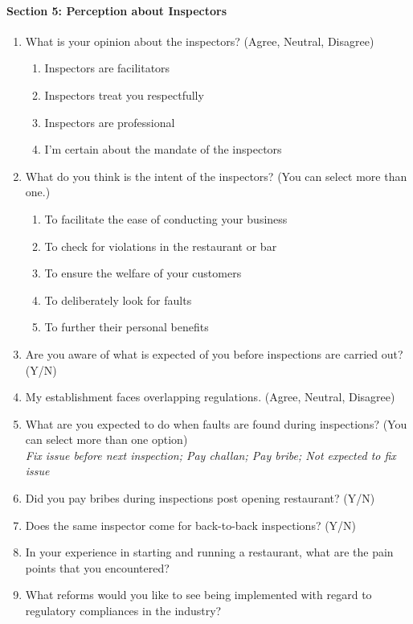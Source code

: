 \documentclass[a4paper, 12pt]{article}
\begin{document}
	\paragraph {Section 5: Perception about Inspectors}
		\begin {enumerate}[topsep=0pt, nosep]
		\item What is your opinion about the inspectors? (Agree, Neutral, Disagree)
			\begin {enumerate}[nosep]
			\item Inspectors are facilitators
			\item Inspectors treat you respectfully
			\item Inspectors are professional
			\item I’m certain about the mandate of the inspectors
			\end {enumerate}
		\item What do you think is the intent of the inspectors? (You can select more than one.)
			\begin {enumerate}[nosep]
			\item To facilitate the ease of conducting your business
			\item To check for violations in the restaurant or bar
			\item To ensure the welfare of your customers
			\item To deliberately look for faults
			\item To further their personal benefits
			\end {enumerate}
		\item Are you aware of what is expected of you before inspections are carried out?(Y/N)
		\item My establishment faces overlapping regulations. (Agree, Neutral, Disagree)
		\item What are you expected to do when faults are found during inspections? (You can select more than one option)\\
		\textit{Fix issue before next inspection; Pay challan; Pay bribe; Not expected to fix issue}
		\item Did you pay bribes during inspections post opening restaurant? (Y/N)
		\item Does the same inspector come for back-to-back inspections? (Y/N)
		\item In your experience in starting and running a restaurant, what are the pain points that you encountered?
		\item What reforms would you like to see being implemented with regard to regulatory compliances in the industry?
		\end {enumerate}
       

                    
                    
                    
\end{document}
